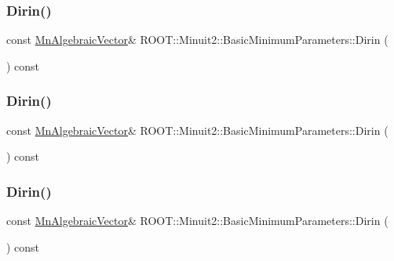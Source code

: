 \subsubsection{\texorpdfstring{Dirin()}{Dirin()}\hspace{0.1cm}{\footnotesize\ttfamily [1/3]}}
{\footnotesize\ttfamily const \mbox{\hyperlink{namespaceROOT_1_1Minuit2_a62ed97730a1ca8d3fbaec64a19aa11c9}{Mn\+Algebraic\+Vector}}\& R\+O\+O\+T\+::\+Minuit2\+::\+Basic\+Minimum\+Parameters\+::\+Dirin (\begin{DoxyParamCaption}{ }\end{DoxyParamCaption}) const\hspace{0.3cm}{\ttfamily [inline]}}

\mbox{\label{classROOT_1_1Minuit2_1_1BasicMinimumParameters_a4a4abef44e633bce699eb280228702e1}} 
\subsubsection{\texorpdfstring{Dirin()}{Dirin()}\hspace{0.1cm}{\footnotesize\ttfamily [2/3]}}
{\footnotesize\ttfamily const \mbox{\hyperlink{namespaceROOT_1_1Minuit2_a62ed97730a1ca8d3fbaec64a19aa11c9}{Mn\+Algebraic\+Vector}}\& R\+O\+O\+T\+::\+Minuit2\+::\+Basic\+Minimum\+Parameters\+::\+Dirin (\begin{DoxyParamCaption}{ }\end{DoxyParamCaption}) const\hspace{0.3cm}{\ttfamily [inline]}}

\mbox{\label{classROOT_1_1Minuit2_1_1BasicMinimumParameters_a4a4abef44e633bce699eb280228702e1}} 
\subsubsection{\texorpdfstring{Dirin()}{Dirin()}\hspace{0.1cm}{\footnotesize\ttfamily [3/3]}}
{\footnotesize\ttfamily const \mbox{\hyperlink{namespaceROOT_1_1Minuit2_a62ed97730a1ca8d3fbaec64a19aa11c9}{Mn\+Algebraic\+Vector}}\& R\+O\+O\+T\+::\+Minuit2\+::\+Basic\+Minimum\+Parameters\+::\+Dirin (\begin{DoxyParamCaption}{ }\end{DoxyParamCaption}) const\hspace{0.3cm}{\ttfamily [inline]}}

